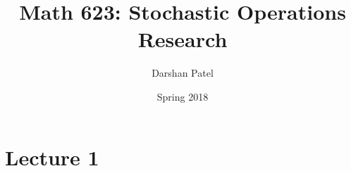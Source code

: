 \documentclass[12pt]{article}
\begin{document}
\theoremstyle{definition}
\newtheorem{theorem}{Theorem}[section]
\newtheorem{definition}{Definition}[section]
\newtheorem{example}{Example}[section]
\newtheorem{question}{Question}[section]

\newcommand{\expe}[1]{\mathrm{E}[ #1 ]}
\newcommand{\var}[1]{\mathrm{Var}[ #1 ]}
\newcommand{\prob}[1]{\mathrm{P}( #1 )}
\newcommand{\geom}[1]{\text{Geometric}( #1 )}
\newcommand{\expo}[1]{\text{Exp}( #1 )}
\newcommand{\poisson}[1]{\text{Poisson}( #1 )}
\newcommand{\qs}{Queueing System }
\newcommand{\set}[1]{\Big\{ #1 \Big\}}







\title{Math 623: Stochastic Operations Research}
\author{Darshan Patel}
\date{Spring 2018}
\maketitle

\tableofcontents

\section{Lecture 1} 
\end{document}

